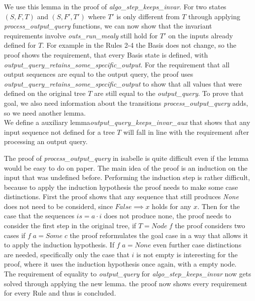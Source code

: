  We use this lemma in the proof of \textit{algo\_step\_keeps\_invar}. For two states $(S,F,T)$ and $(S,F',T')$ where $T'$ is only different from $T$ through applying \textit{process\_output\_query} functions, we can now show that the invariant requirements involve \textit{outs\_run\_mealy} still hold for $T'$ on the inputs already defined for $T$. For example in the Rules 2-4 the Basis does not change, so the proof shows the requirement, that every Basis state is defined, with \textit{output\_query\_retains\_some\_specific\_output}. For the requirement that all output sequences are equal to the output query, the proof uses \textit{output\_query\_retains\_some\_specific\_output} to show that all values that were defined on the original tree $T$ are still equal to the \textit{output\_query}. To prove that goal, we also need information about the transitions \textit{process\_output\_query} adds, so we need another lemma.\\
We define a auxiliary lemma\textit{output\_query\_keeps\_invar\_aux} that shows that any input sequence not defined for a tree $T$ will fall in line with the requirement after processing an output query.
\begin{myisabelle}
	\oqueryinvaraux
\end{myisabelle} 
The proof of \textit{process\_output\_query} in isabelle is quite difficult even if the lemma would be easy to do on paper. The main idea of the proof is an induction on the input that was undefined before. Performing the induction step is rather difficult, because to apply the induction hypothesis the proof needs to make some case distinctions. First the proof shows that any sequence that still produces \textit{None} does not need to be considerd, since $False \implies x$ holds for any $x$. Then for the case that the sequences $is=a\cdot i$ does not produce none, the proof needs to consider the first step in the original tree, if $T=Node\; f$ the proof considers two cases if $f\; a = Some\; c$ the proof reformulates the goal case in a way that allows it to apply the induction hypothesis. If $f\; a=None$ even further case distinctions are needed, specifically only the case that $i$ is not empty is interesting for the proof, where it uses the induction hypothesis once again, with a empty node.\\
The requirement of equality to \textit{output\_query} for \textit{algo\_step\_keeps\_invar} now gets solved through applying the new lemma. the proof now shows every requirement for every Rule and thus is concluded. 
